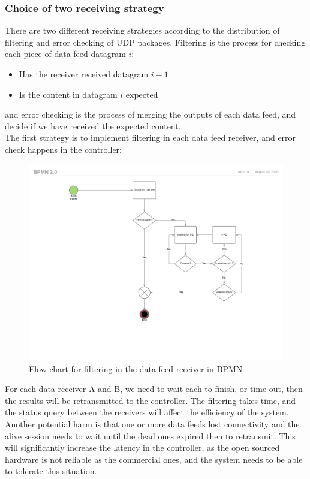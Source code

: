 \documentclass[11pt,openright,a4paper]{report}
\begin{document}
\subsubsection{Choice of two receiving strategy}
There are two different receiving strategies according to the distribution of filtering and error checking of UDP packages. Filtering is the process for checking each piece of data feed datagram $i$: 
\begin{itemize}
	\item Has the receiver received datagram $i-1$
	\item Is the content in datagram $i$ expected
\end{itemize}
and error checking is the process of merging the outputs of each data feed, and decide if we have received the expected content.\\
The first strategy is to implement filtering in each data feed receiver, and error check happens in the controller:
\begin{figure}[H]
\centering
\includegraphics[width=1.0\linewidth]{picture/Stg_1Recv}
\caption{Flow chart for filtering in the data feed receiver in BPMN}
\label{fig:Stg_1Recv}
\end{figure}
For each data receiver A and B, we need to wait each to finish, or time out, then the results will be retransmitted to the controller. The filtering takes time, and the status query between the receivers will affect the efficiency of the system. Another potential harm is that one or more data feeds lost connectivity and the alive session needs to wait until the dead ones expired then to retransmit. This will significantly increase the latency in the controller, as the open sourced hardware is not reliable as the commercial ones, and the system needs to be able to tolerate this situation.\\
\end{document}
